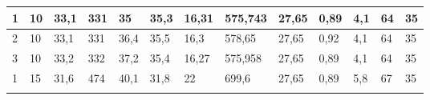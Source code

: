 \begin{table}[H]
{\begin{tabular}{|l|llll|lll|ll|l|ll|}
\rowcolor[HTML]{C6E0B4} 
1             & \multicolumn{1}{l|}{\cellcolor[HTML]{C6E0B4}10}               & \multicolumn{1}{l|}{\cellcolor[HTML]{C6E0B4}33,1}             & \multicolumn{1}{l|}{\cellcolor[HTML]{C6E0B4}331}              & 35                & \multicolumn{1}{l|}{\cellcolor[HTML]{C6E0B4}35,3}              & \multicolumn{1}{l|}{\cellcolor[HTML]{C6E0B4}16,31}             & 575,743           & \multicolumn{1}{l|}{\cellcolor[HTML]{C6E0B4}27,65}            & 0,89             & 4,1                       & \multicolumn{1}{l|}{\cellcolor[HTML]{C6E0B4}64}                  & 35               \\ \hline
\rowcolor[HTML]{E2EFDA} 
2             & \multicolumn{1}{l|}{\cellcolor[HTML]{E2EFDA}10}               & \multicolumn{1}{l|}{\cellcolor[HTML]{E2EFDA}33,1}             & \multicolumn{1}{l|}{\cellcolor[HTML]{E2EFDA}331}              & 36,4              & \multicolumn{1}{l|}{\cellcolor[HTML]{E2EFDA}35,5}              & \multicolumn{1}{l|}{\cellcolor[HTML]{E2EFDA}16,3}              & 578,65            & \multicolumn{1}{l|}{\cellcolor[HTML]{E2EFDA}27,65}            & 0,92             & 4,1                       & \multicolumn{1}{l|}{\cellcolor[HTML]{E2EFDA}64}                  & 35               \\ \hline
\rowcolor[HTML]{C6E0B4} 
3             & \multicolumn{1}{l|}{\cellcolor[HTML]{C6E0B4}10}               & \multicolumn{1}{l|}{\cellcolor[HTML]{C6E0B4}33,2}             & \multicolumn{1}{l|}{\cellcolor[HTML]{C6E0B4}332}              & 37,2              & \multicolumn{1}{l|}{\cellcolor[HTML]{C6E0B4}35,4}              & \multicolumn{1}{l|}{\cellcolor[HTML]{C6E0B4}16,27}             & 575,958           & \multicolumn{1}{l|}{\cellcolor[HTML]{C6E0B4}27,65}            & 0,89             & 4,1                       & \multicolumn{1}{l|}{\cellcolor[HTML]{C6E0B4}64}                  & 35               \\ \hline
\rowcolor[HTML]{E2EFDA} 
1             & \multicolumn{1}{l|}{\cellcolor[HTML]{E2EFDA}15}               & \multicolumn{1}{l|}{\cellcolor[HTML]{E2EFDA}31,6}             & \multicolumn{1}{l|}{\cellcolor[HTML]{E2EFDA}474}              & 40,1              & \multicolumn{1}{l|}{\cellcolor[HTML]{E2EFDA}31,8}              & \multicolumn{1}{l|}{\cellcolor[HTML]{E2EFDA}22}                & 699,6             & \multicolumn{1}{l|}{\cellcolor[HTML]{E2EFDA}27,65}            & 0,89             & 5,8                       & \multicolumn{1}{l|}{\cellcolor[HTML]{E2EFDA}67}                  & 35               \\ \hline
\rowcolor[HTML]{C6E0B4} 

\end{tabular}}
\end{table}
